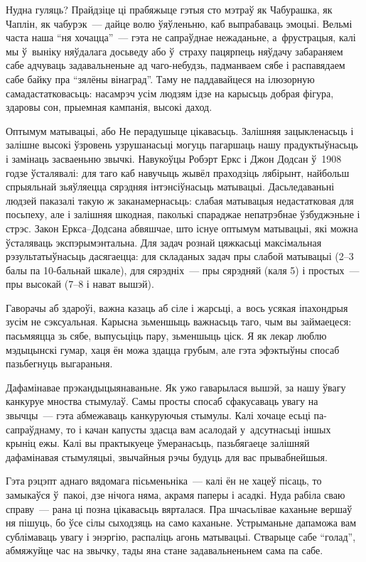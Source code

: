 Нудна гуляць? Прайдзіце ці прабяжыце гэтыя сто мэтраў як Чабурашка, як Чаплін, як чабурэк~--- дайце волю ўяўленьню, каб выпрабаваць эмоцыі. Вельмі часта наша ``ня хочацца''~--- гэта не сапраўднае нежаданьне, а~фрустрацыя, калі мы ў~выніку няўдалага досьведу або ў~страху пацярпець няўдачу забараняем сабе адчуваць задавальненьне ад чаго-небудзь, падманваем сябе і распавядаем сабе байку пра ``зялёны вінаград''. Таму не паддавайцеся на ілюзорную самадастатковасьць: насамрэч усім людзям ідзе на карысьць добрая фігура, здаровы сон, прыемная кампанія, высокі даход.

Оптымум матывацыі, або Не перадушыце цікавасьць. Залішняя зацыкленасьць і залішне высокі ўзровень узрушанасьці могуць пагаршаць нашу прадуктыўнасьць і замінаць засваеньню звычкі. Навукоўцы Робэрт Еркс і Джон Додсан ў~1908 годзе ўсталявалі: для таго каб навучыць жывёл праходзіць лябірынт, найбольш спрыяльнай зьяўляецца сярэдняя інтэнсіўнасьць матывацыі. Дасьледаваньні людзей паказалі такую ж заканамернасьць: слабая матывацыя недастатковая для посьпеху, але і залішняя шкодная, паколькі спараджае непатрэбнае ўзбуджэньне і стрэс. Закон Еркса--Додсана абвяшчае, што існуе оптымум матывацыі, які можна ўсталяваць экспэрымэнтальна. Для задач рознай цяжкасьці максімальная рэзультатыўнасьць дасягаецца: для складаных задач пры слабой матывацыі (2--3 балы па 10-бальнай шкале), для сярэдніх~--- пры сярэдняй (каля 5) і простых~--- пры высокай (7--8 і нават вышэй).

Гаворачы аб здароўі, важна казаць аб сіле і жарсьці, а~вось усякая іпахондрыя зусім не сэксуальная. Карысна зьменшыць важнасьць таго, чым вы займаецеся: пасьмяяцца зь сябе, выпусьціць пару, зьменшыць ціск. Я як лекар люблю мэдыцынскі гумар, хаця ён можа здацца грубым, але гэта эфэктыўны спосаб пазьбегнуць выгараньня.

Дафамінавае прэкандыцыянаваньне. Як ужо гаварылася вышэй, за нашу ўвагу канкуруе мноства стымулаў. Самы просты спосаб сфакусаваць увагу на звычцы~--- гэта абмежаваць канкуруючыя стымулы. Калі хочаце есьці па-сапраўднаму, то і качан капусты здасца вам асалодай у~адсутнасьці іншых крыніц ежы. Калі вы практыкуеце ўмеранасьць, пазьбягаеце залішняй дафамінавая стымуляцыі, звычайныя рэчы будуць для вас прывабнейшыя.

Гэта рэцэпт аднаго вядомага пісьменьніка~--- калі ён не хацеў пісаць, то замыкаўся ў~пакоі, дзе нічога няма, акрамя паперы і асадкі. Нуда рабіла сваю справу~--- рана ці позна цікавасьць вярталася. Пра шчасьлівае каханьне вершаў ня пішуць, бо ўсе сілы сыходзяць на само каханьне. Устрыманьне дапаможа вам сублімаваць увагу і энэргію, распаліць агонь матывацыі. Стварыце сабе ``голад'', абмяжуйце час на звычку, тады яна стане задавальненьнем сама па сабе.

